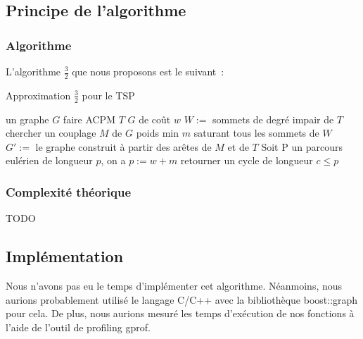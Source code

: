 \subsection{Principe de l'algorithme}

\subsubsection{Algorithme}

L'algorithme $\frac{3}{2}$ que nous proposons est le suivant~:

\begin{algorithm}[!ht]
\caption{Approximation $\frac{3}{2}$ pour le TSP}
\label{3-2tsp}
\begin{algorithmic}[1]
\REQUIRE un graphe $G$
\STATE faire ACPM $T$ $G$ de coût $w$
\STATE $W := $ sommets de degré impair de $T$
\STATE chercher un couplage $M$ de $G$ poids min $m$ saturant tous les
sommets de $W$
\STATE $G' := $ le graphe construit à partir des arêtes de $M$ et de
$T$
\STATE Soit P un parcours eulérien de longueur $p$, on a $p:= w + m$
\STATE retourner un cycle de longueur $c \leq p$
\end{algorithmic}
\end{algorithm}

\subsubsection{Complexité théorique}

TODO

\subsection{Implémentation}

Nous n'avons pas eu le temps d'implémenter cet algorithme. Néanmoins,
nous aurions probablement utilisé le langage C/C++ avec la
bibliothèque boost::graph pour cela. De plus, nous aurions mesuré les
temps d'exécution de nos fonctions à l'aide de l'outil de profiling gprof.
